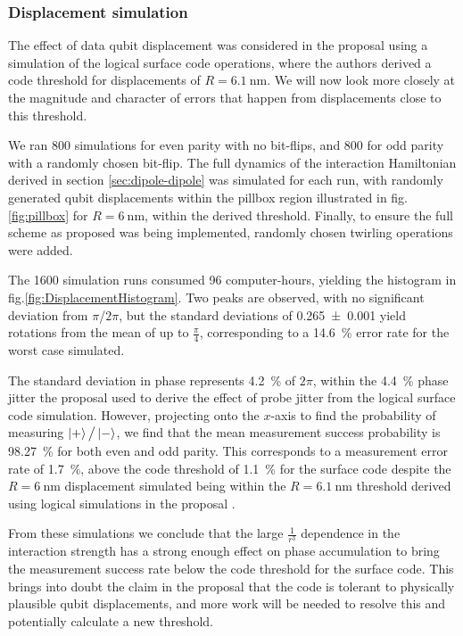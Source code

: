 
\subsubsection{Displacement simulation}\label{sec:DisplacementSimulation}
The effect of data qubit displacement was considered in the proposal \cite{OGorman2016} using a simulation of the logical surface code operations, where the authors derived a code threshold for displacements of $R=\SI{6.1}{\nano\metre}$. We will now look more closely at the magnitude and character of errors that happen from displacements close to this threshold. 

We ran 800 simulations for even parity with no bit-flips, and 800 for odd parity with a randomly chosen bit-flip. The full dynamics of the interaction Hamiltonian derived in section \ref{sec:dipole-dipole} was simulated for each run, with randomly generated qubit displacements within the pillbox region illustrated in fig.\@ \ref{fig:pillbox} for $R = \SI{6}{\nano\metre}$, within the derived threshold. Finally, to ensure the full scheme as proposed was being implemented, randomly chosen twirling operations were added.

The 1600 simulation runs consumed 96 computer-hours, yielding the histogram in fig.\@ \ref{fig:DisplacementHistogram}. Two peaks are observed, with no significant deviation from $\pi$/$2\pi$, but the standard deviations of \num{0.265+-0.001} yield rotations from the mean of up to $\tfrac{\pi}{4}$, corresponding to a \SI{14.6}{\percent} error rate for the worst case simulated.

The standard deviation in phase represents \SI{4.2}{\percent} of $2\pi$, within the \SI{4.4}{\percent} phase jitter the proposal \cite{OGorman2016} used to derive the effect of probe jitter from the logical surface code simulation. However, projecting onto the $x$-axis to find the probability of measuring $\ket{+}\big/\ket{-}$, we find that the mean measurement success probability is \SI{98.27}{\percent} for both even and odd parity. This corresponds to a measurement error rate of \SI{1.7}{\percent}, above the code threshold of \SI{1.1}{\percent} for the surface code \cite{Wang2011,Fowler2012} despite the $R = \SI{6}{\nano\metre}$ displacement simulated being within the $R=\SI{6.1}{\nano\metre}$ threshold derived using logical simulations in the proposal \cite{OGorman2016}. 

From these simulations we conclude that the large $\tfrac{1}{r^3}$ dependence in the interaction strength has a strong enough effect on phase accumulation to bring the measurement success rate below the code threshold for the surface code. This brings into doubt the claim in the proposal \cite{OGorman2016} that the code is tolerant to physically plausible qubit displacements, and more work will be needed to resolve this and potentially calculate a new threshold.


